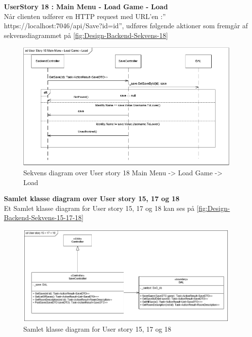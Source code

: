 \textbf{UserStory 18 : Main Menu - Load Game - Load}\\
Når clienten udfører en HTTP request med URL’en :” https://localhost:7046/api/Save?id={id}”, udføres følgende aktioner som fremgår af sekvensdiagrammet på \autoref{fig:Design-Backend-Sekvens-18}\\

\begin{figure}[H]
\centering
\includegraphics[width = \textwidth]{02-Body/Images/Backend_sekvens_18.PNG}
\caption{Sekvens diagram over User story 18 Main Menu -> Load Game -> Load}
\label{fig:Design-Backend-Sekvens-18}
\end{figure}


\textbf{Samlet klasse diagram over User story 15, 17 og 18}\\
Et Samlet klasse diagram for User story 15, 17 og 18 kan ses på \autoref{fig:Design-Backend-Sekvens-15-17-18}\\

\begin{figure}[H]
\centering
\includegraphics[width = \textwidth]{02-Body/Images/Backend_klasse_15_17_18.PNG}
\caption{Samlet klasse diagram for User story 15, 17 og 18}
\label{fig:Design-Backend-Sekvens-15-17-18}
\end{figure}


